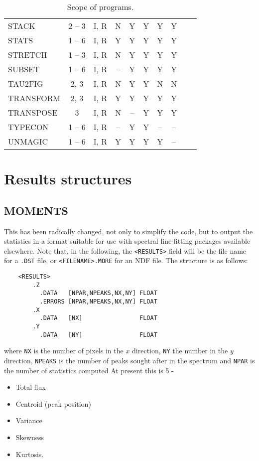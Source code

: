 {\begin{table}[htb]
\begin{center}
\begin{tabular}{|l|c|c|c|c|c|c|c|c|c|}
STACK     & 2 -- 3 & I, R & N & Y & Y & Y & Y\\
STATS     & 1 -- 6 & I, R & Y & Y & Y & Y & Y\\
STRETCH   & 1 -- 3 & I, R & N & Y & Y & Y & Y\\
SUBSET    & 1 -- 6 & I, R & -- & Y & Y & Y & Y\\
TAU2FIG   & 2, 3   & I, R & N & Y & Y & N & N\\
TRANSFORM & 2, 3   & I, R & Y & Y & Y & Y & Y\\
TRANSPOSE & 3      & I, R & N & -- & Y & Y & Y\\
TYPECON   & 1 -- 6 & I, R & -- & Y & Y & -- & --\\
UNMAGIC   & 1 -- 6 & I, R & Y & Y & Y & Y & --\\
\hline
\end{tabular}
\end{center}
\caption{Scope of programs.}
\label{tab}
\end{table}
}

\section{Results structures}

\subsection{MOMENTS}

This has been radically changed, not only to simplify the code, but to output
the statistics in a format suitable for use with spectral line-fitting packages
available elsewhere. Note that, in the following,
the {\tt <RESULTS>} field will be the file name for a {\tt .DST} file, or
{\tt <FILENAME>.MORE} for an NDF file.
The structure is as follows:
\begin{verbatim}
    <RESULTS> 
        .Z
          .DATA   [NPAR,NPEAKS,NX,NY] FLOAT
          .ERRORS [NPAR,NPEAKS,NX,NY] FLOAT
        .X      
          .DATA   [NX]                FLOAT
        .Y     
          .DATA   [NY]                FLOAT
\end{verbatim}
where {\tt NX} is the number of pixels in the $x$ direction, {\tt NY} the
number in the $y$ direction, {\tt NPEAKS} is the number of peaks sought
after in the spectrum and {\tt NPAR} is the number of statistics computed 
At present this is 5 -
\begin{itemize}
\item Total flux
\item Centroid (peak position)
\item Variance
\item Skewness
\item Kurtosis.
\end{itemize}

